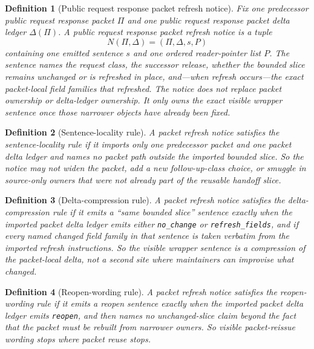 \documentclass[11pt]{article}
\newtheorem{definition}{Definition}
\begin{document}
\begin{definition}[Public request response packet refresh notice]
Fix one predecessor public request response packet $\Pi$ and one public request response packet delta ledger $\Delta(\Pi)$.
A \emph{public request response packet refresh notice} is a tuple
\[
N(\Pi,\Delta)=(\Pi,\Delta,s,P)
\]
containing one emitted sentence $s$ and one ordered reader-pointer list $P$.
The sentence names the request class, the successor release, whether the bounded slice remains unchanged or is refreshed in place, and---when refresh occurs---the exact packet-local field families that refreshed.
The notice does not replace packet ownership or delta-ledger ownership.
It only owns the exact visible wrapper sentence once those narrower objects have already been fixed.
\end{definition}

\begin{definition}[Sentence-locality rule]
A packet refresh notice satisfies the \emph{sentence-locality rule} if it imports only one predecessor packet and one packet delta ledger and names no packet path outside the imported bounded slice.
So the notice may not widen the packet, add a new follow-up-class choice, or smuggle in source-only owners that were not already part of the reusable handoff slice.
\end{definition}

\begin{definition}[Delta-compression rule]
A packet refresh notice satisfies the \emph{delta-compression rule} if it emits a ``same bounded slice'' sentence exactly when the imported packet delta ledger emits either \texttt{no\_change} or \texttt{refresh\_fields}, and if every named changed field family in that sentence is taken verbatim from the imported refresh instructions.
So the visible wrapper sentence is a compression of the packet-local delta, not a second site where maintainers can improvise what changed.
\end{definition}

\begin{definition}[Reopen-wording rule]
A packet refresh notice satisfies the \emph{reopen-wording rule} if it emits a reopen sentence exactly when the imported packet delta ledger emits \texttt{reopen}, and then names no unchanged-slice claim beyond the fact that the packet must be rebuilt from narrower owners.
So visible packet-reissue wording stops where packet reuse stops.
\end{definition}
\end{document}
